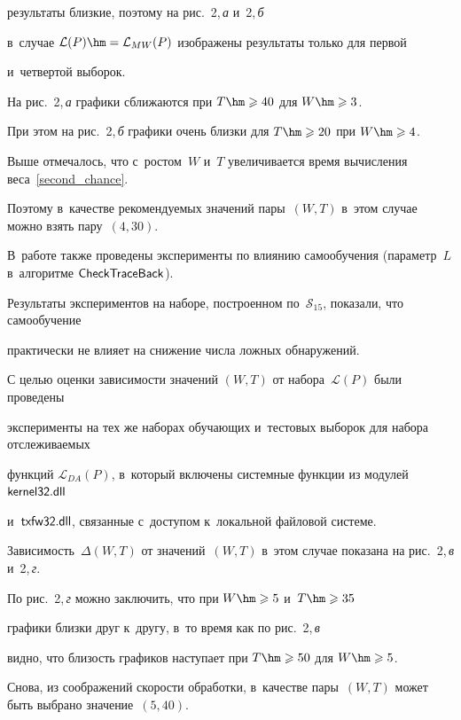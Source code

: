 результаты близкие, поэтому на рис.~2,\,\textit{а} и~2,\,\textit{б} 

в~случае $\mathcal{L}(P)\hm=\mathcal{L}_{MW}(P)$ изображены результаты только для первой 

и~четвертой выборок. 

На рис.~2,\,\textit{а} графики сближаются при $T\hm\geqslant 40$ для $W\hm\geqslant 3$. 

При этом на рис.~2,\,\textit{б} графики очень близ\-ки для $T\hm\geqslant 20$ при $W\hm\geqslant 4$. 

Выше отмечалось, что с~ростом~$W$ и~$T$ увеличивается время вычисления веса~\eqref{second_chance}. 

Поэтому в~качестве рекомендуемых значений пары~$(W,T)$ в~этом случае можно взять пару~$(4,30)$. 

В~работе также проведены эксперименты по влиянию самообучения (параметр~$L$ в~алгоритме ${\sf CheckTraceBack}$). 

Результаты экспериментов на наборе, по\-стро\-ен\-ном по~$\mathcal{S}_{15}$, показали, что самообучение 

практически не влияет на снижение чис\-ла лож\-ных обнаружений.

{ %



}







С целью оценки зависимости значений $(W,T)$ от набора~$\mathcal{L}(P)$ были проведены

 эксперименты на тех же наборах обуча\-ющих и~тес\-то\-вых выборок для набора от\-сле\-жи\-ва\-емых 

 функций $\mathcal{L}_{DA}(P)$, в~который вклю\-че\-ны сис\-тем\-ные функции из модулей ${\sf kernel32.dll}$ 

 и~${\sf txfw32.dll}$, связанные с~до\-сту\-пом к~локальной фай\-ло\-вой сис\-те\-ме. 

 Зависимость~$\Delta(W,T)$ от значений~$(W,T)$ в~этом случае показана на рис.~2,\,\textit{в} и~2,\,\textit{г}. 

 По рис.~2,\,\textit{г} можно заключить, что при $W\hm\geqslant 5$ и~$T\hm\geqslant 35$ 

 графики близки друг к~другу, в~то время как по рис.~2,\,\textit{в} 

 видно, что близость графиков наступает при $T\hm\geqslant 50$ для $W\hm\geqslant 5$. 

 Снова, из соображений ско\-рости обработки, в~качестве пары~$(W,T)$ может быть выбрано значение~$(5,40)$. 



